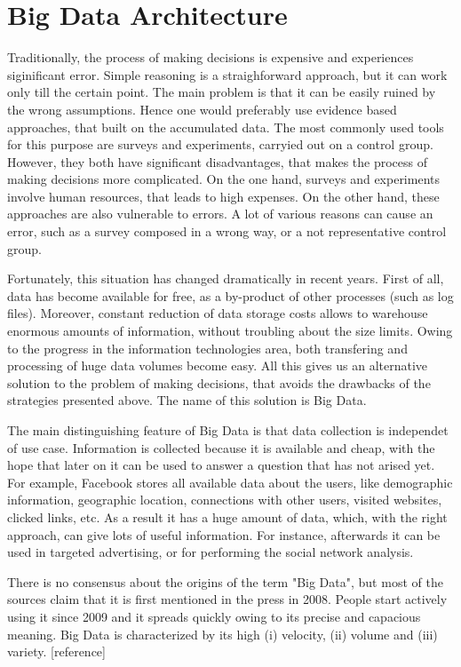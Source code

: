 \chapter{Big Data Architecture}
\label{chap:big_data_architecture}

Traditionally, the process of making decisions is expensive and experiences siginificant error.
Simple reasoning is a straighforward approach, but it can work only till the certain point.
The main problem is that it can be easily ruined by the wrong assumptions.
Hence one would preferably use evidence based approaches, that built on the accumulated data.
The most commonly used tools for this purpose are surveys and experiments, carryied out on a control group.   
However, they both have significant disadvantages, that makes the process of making decisions more complicated. 
On the one hand, surveys and experiments involve human resources, that leads to high expenses.
On the other hand, these approaches are also vulnerable to errors.
A lot of various reasons can cause an error, such as a survey composed in a wrong way, or a not representative control group.
 
Fortunately, this situation has changed dramatically in recent years.
First of all, data has become available for free, as a by-product of other processes (such as log files).
Moreover, constant reduction of data storage costs allows to warehouse enormous amounts of information, without troubling about the size limits.
Owing to the progress in the information technologies area, both transfering and processing of huge data volumes become easy.
All this gives us an alternative solution to the problem of making decisions, that avoids the drawbacks of the strategies presented above.
The name of this solution is Big Data.

The main distinguishing feature of Big Data is that data collection is independet of use case.
Information is collected because it is available and cheap, with the hope that later on it can be used to answer a question that has not arised yet.
For example, Facebook stores all available data about the users, like demographic information, geographic location, connections with other users, visited websites, clicked links, etc.
As a result it has a huge amount of data, which, with the right approach, can give lots of useful information. 
For instance, afterwards it can be used in targeted advertising, or for performing the social network analysis.

There is no consensus about the origins of the term "Big Data", but most of the sources claim that it is first mentioned in the press in 2008.
People start actively using it since 2009 and it spreads quickly owing to its precise and capacious meaning. 
Big Data is characterized by its high (i) velocity, (ii) volume and (iii) variety. [reference]

